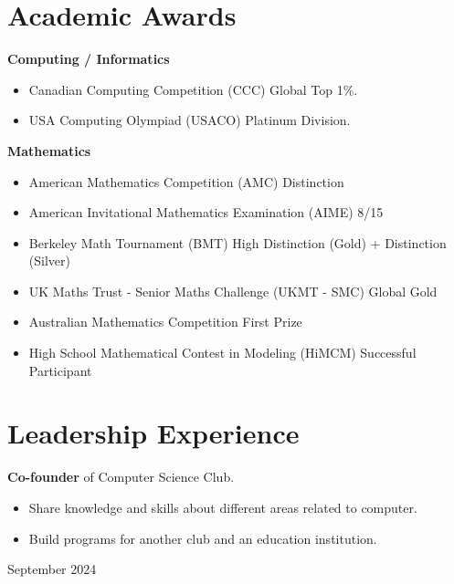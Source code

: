 \documentclass[10pt, letterpaper]{article}
\newenvironment{highlights}{
    \begin{itemize}[
        topsep=0.10 cm,
        parsep=0.10 cm,
        partopsep=0pt,
        itemsep=0pt,
        leftmargin=0.4 cm + 10pt
    ]
}{
    \end{itemize}
} %
\newenvironment{twocolentry}[2][]{
    \onecolentry
    \def\secondColumn{#2}
    \setcolumnwidth{\fill, 4.5 cm}
    \begin{paracol}{2}
}{
    \switchcolumn \raggedleft \secondColumn
    \end{paracol}
    \endonecolentry
} %
\begin{document}
    \section{Academic Awards}

    
    \textbf{Computing / Informatics}

    \begin{highlights}
        \item Canadian Computing Competition (CCC) \hfill Global Top 1\%.

        \item USA Computing Olympiad (USACO) \hfill Platinum Division.
    \end{highlights}

    \textbf{Mathematics}
    
    \begin{highlights}
        \item American Mathematics Competition (AMC) \hfill Distinction

        \item American Invitational Mathematics Examination (AIME) \hfill 8/15

        \item Berkeley Math Tournament (BMT) \hfill High Distinction (Gold) + Distinction (Silver)

        \item UK Maths Trust - Senior Maths Challenge (UKMT - SMC) \hfill Global Gold

        \item Australian Mathematics Competition \hfill First Prize

        \item High School Mathematical Contest in Modeling (HiMCM) \hfill Successful Participant
    \end{highlights}
    

    \section{Leadership Experience}
    
    \begin{twocolentry}{ September 2024 }
        \textbf{Co-founder} of Computer Science Club.

        \begin{highlights}
            \item Share knowledge and skills about different areas related to computer.
            \item Build programs for another club and an education institution.
        \end{highlights}
    \end{twocolentry}
\end{document}
